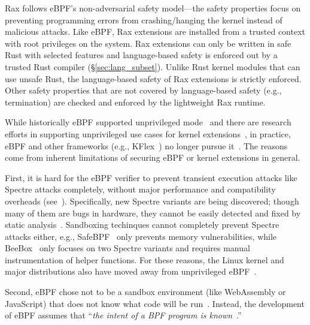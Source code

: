 Rax follows eBPF's non-adversarial safety model---the
    safety properties focus
    on preventing programming errors from crashing/hanging the kernel instead of
    malicious attacks.
Like eBPF, Rax extensions are installed from a trusted context with root
    privileges on the system.
Rax extensions can only be written in safe Rust with selected features
    and language-based safety is enforced out by a trusted Rust compiler (\S\ref{sec:lang_subset}). %
Unlike Rust kernel modules that can use %
    unsafe Rust, the language-based safety of Rax extensions is strictly enforced.
Other safety properties that are not covered by language-based safety (e.g., termination)
    are checked and enforced by the lightweight Rax runtime.

While historically eBPF supported unprivileged mode~\cite{reconsider-unpriv-ebpf-lwn} and
    there are research efforts in supporting
    unprivileged use cases for kernel extensions~\cite{beebox-security24,safebpf-thomas,jia2023},
in practice, eBPF and other frameworks (e.g., KFlex~\cite{dwivedi-sosp24}) no longer pursue
    it~\cite{ebpf-sec-lwn,pawan-8a03e56b253e}.
The reasons come from inherent limitations of securing eBPF
    or kernel extensions in general.

First, it is hard for the eBPF verifier to prevent transient execution attacks like Spectre attacks
    completely, without major performance and compatibility overheads (see~\cite{ebpf-sec-lwn}).
Specifically, new Spectre variants are being discovered; though many of them are bugs in hardware,
    they cannot be easily detected and fixed by static analysis~\cite{perspective_isca}.
Sandboxing techinques cannot completely prevent Spectre attacks either,
    e.g., SafeBPF~\cite{safebpf-thomas} only prevents memory vulnerabilities,
    while BeeBox~\cite{beebox-security24} only focuses on two Spectre variants and requires manual instrumentation of helper functions.
For these reasons, the Linux kernel and major distributions also have moved away from unprivileged
    eBPF~\cite{pawan-8a03e56b253e,unpriv-ebpf-ubuntu,unpriv-ebpf-suse}.

Second, eBPF chose not to be a sandbox environment (like WebAssembly or JavaScript)
    that does not know what code will be run~\cite{ebpf-sec-lwn}.
Instead, the development of eBPF assumes that ``{\it the intent of a BPF program is known}~\cite{ebpf-sec-lwn}.''

